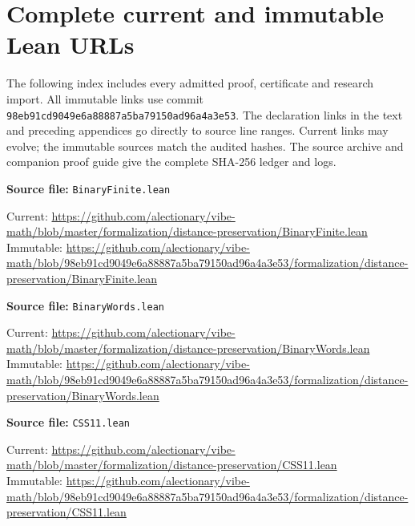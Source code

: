 \clearpage\section{Complete current and immutable Lean URLs}\label{app:lean-links}
The following index includes every admitted proof, certificate and research import.
All immutable links use commit \texttt{98eb91cd9049e6a88887a5ba79150ad96a4a3e53}.
The declaration links in the text and preceding appendices go directly to source line ranges.
Current links may evolve; the immutable sources match the audited hashes.
The source archive and companion proof guide give the complete SHA-256 ledger and logs.
\par\smallskip\noindent\begin{minipage}{\linewidth}\small\setlength{\baselineskip}{11pt}
\textbf{Source file:} \nolinkurl{BinaryFinite.lean}\par\nopagebreak
Current: \url{https://github.com/alectionary/vibe-math/blob/master/formalization/distance-preservation/BinaryFinite.lean}\\
Immutable: \url{https://github.com/alectionary/vibe-math/blob/98eb91cd9049e6a88887a5ba79150ad96a4a3e53/formalization/distance-preservation/BinaryFinite.lean}\par\end{minipage}\par
\par\smallskip\noindent\begin{minipage}{\linewidth}\small\setlength{\baselineskip}{11pt}
\textbf{Source file:} \nolinkurl{BinaryWords.lean}\par\nopagebreak
Current: \url{https://github.com/alectionary/vibe-math/blob/master/formalization/distance-preservation/BinaryWords.lean}\\
Immutable: \url{https://github.com/alectionary/vibe-math/blob/98eb91cd9049e6a88887a5ba79150ad96a4a3e53/formalization/distance-preservation/BinaryWords.lean}\par\end{minipage}\par
\par\smallskip\noindent\begin{minipage}{\linewidth}\small\setlength{\baselineskip}{11pt}
\textbf{Source file:} \nolinkurl{CSS11.lean}\par\nopagebreak
Current: \url{https://github.com/alectionary/vibe-math/blob/master/formalization/distance-preservation/CSS11.lean}\\
Immutable: \url{https://github.com/alectionary/vibe-math/blob/98eb91cd9049e6a88887a5ba79150ad96a4a3e53/formalization/distance-preservation/CSS11.lean}\par\end{minipage}\par
